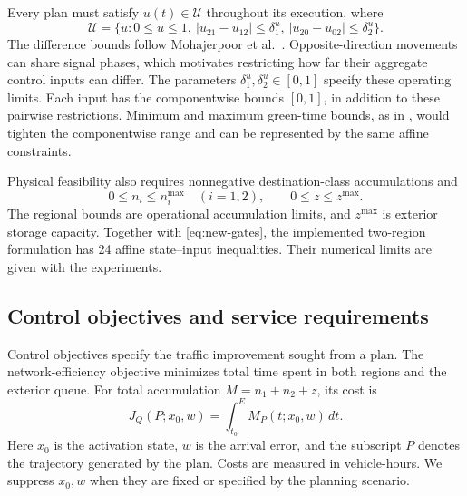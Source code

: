\documentclass[preprint,12pt]{elsarticle}
\theoremstyle{definition}
\theoremstyle{plain}
\theoremstyle{definition}
\theoremstyle{plain}
\begin{document}
Every plan must satisfy $u(t)\in\mathcal U$ throughout its execution,
where
\begin{equation}
\mathcal U=\{u:0\le u\le1,\ |u_{21}-u_{12}|\le\delta_1^u,
\ |u_{20}-u_{02}|\le\delta_2^u\}.
\label{eq:new-gates}
\end{equation}
The difference bounds follow Mohajerpoor et al.~\cite{mohajerpoor2020hinf}. Opposite-direction
movements can share signal phases, which motivates restricting how far
their aggregate control inputs can differ. The parameters
$\delta_1^u,\delta_2^u\in[0,1]$ specify these operating limits. Each input has the componentwise bounds $[0,1]$, in addition to these
pairwise restrictions. Minimum and maximum green-time bounds, as in
\cite{mohajerpoor2020hinf}, would tighten the componentwise range and
can be represented by the same affine constraints.

Physical feasibility also requires nonnegative destination-class
accumulations and
\[
0\le n_i\le n_i^{\max}\quad(i=1,2),\qquad 0\le z\le z^{\max}.
\]
The regional bounds are operational accumulation limits, and $z^{\max}$
is exterior storage capacity. Together with \eqref{eq:new-gates}, the
implemented two-region formulation has 24 affine state--input
inequalities. Their numerical limits are given with the experiments.

\subsection{Control objectives and service requirements}
\label{sec:benchmark-formulation}

Control objectives specify the traffic improvement sought from a plan.
The network-efficiency objective minimizes total time spent in both
regions and the exterior queue. For total accumulation
$M=n_1+n_2+z$, its cost is
\begin{equation}
J_Q(P;x_0,w)=\int_{t_0}^{E}M_P(t;x_0,w)\,dt.
\label{eq:benchmark-queue-cost}
\end{equation}
Here $x_0$ is the activation state, $w$ is the arrival error, and the
subscript $P$ denotes the trajectory generated by the plan. Costs are
measured in vehicle-hours. We suppress $x_0,w$ when they are fixed or
specified by the planning scenario.
\end{document}
